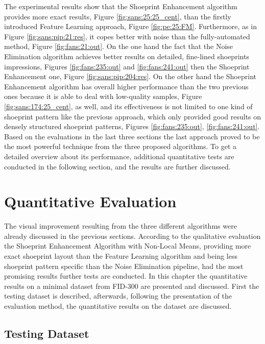 \documentclass[draft,final]{vutinfth} %
\begin{document}
\par
The experimental results show that the Shoeprint Enhancement algorithm provides more exact results, Figure \ref{fig:sans:25:25_cent}, than the firstly introduced Feature Learning approach, Figure \ref{fig:pe:25:FM}.
Furthermore, as in Figure \ref{fig:sans:pip:21:res}, it copes better with noise than the fully-automated method, Figure \ref{fig:fans:21:out}.
On the one hand the fact that the Noise Elimination algorithm achieves better results on detailed, fine-lined shoeprints impressions, Figures \ref{fig:fans:235:out} and \ref{fig:fans:241:out} then the Shoeprint Enhancement one, Figure \ref{fig:sans:pip:204:res}.
On the other hand the Shoeprint Enhancement algorithm has overall higher performance than the two previous ones because it is able to deal with low-quality samples, Figure \ref{fig:sans:174:25_cent}, as well, and its effectiveness is not limited to one kind of shoeprint pattern like the previous approach, which only provided good results on densely structured shoeprint patterns, Figures \ref{fig:fans:235:out}, \ref{fig:fans:241:out}. 
Based on the evaluations in the last three sections the last approach proved to be the most powerful technique from the three proposed algorithms.
To get a detailed overview about its performance, additional quantitative tests are conducted in the following section, and the results are further discussed.

\section{Quantitative Evaluation}
\par
The visual improvement resulting from the three different algorithms were already discussed in the previous sections.
According to the qualitative evaluation the Shoeprint Enhancement Algorithm with Non-Local Means, providing more exact shoeprint layout than the Feature Learning algorithm and being less shoeprint pattern specific than the Noise Elimination pipeline, had the most promising results further tests are conducted.
In this chapter the quantitative results on a minimal dataset from FID-300 are presented and discussed.
First the testing dataset is described, afterwards, following the presentation of the evaluation method, the quantitative results on the dataset are discussed.

\subsection{Testing Dataset}
\end{document}
